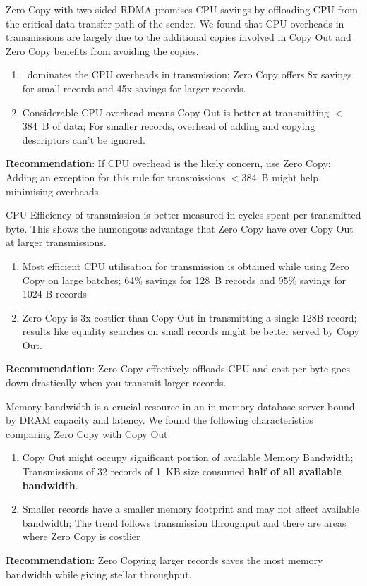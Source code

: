 Zero Copy with two-sided RDMA promises CPU savings by offloading CPU from the critical data transfer path of the sender. We found that 
CPU overheads in transmissions are largely due to the additional copies involved in Copy Out and Zero Copy benefits from avoiding the copies.
  \begin{enumerate}
  \item \memcpy ~dominates the CPU overheads in transmission; Zero Copy offers 8x savings for small records and 45x savings for larger records.
  \item Considerable CPU overhead means Copy Out is better at transmitting $<$384~B of data; For smaller records, overhead of adding and copying descriptors can't be ignored.
  \end{enumerate}
  \textbf{Recommendation}: If CPU overhead is the likely concern, use Zero Copy; Adding an exception for this rule for transmissions $<$384~B might help minimising overheads.

CPU Efficiency of transmission is better measured in cycles spent per transmitted byte. This shows the humongous advantage that Zero Copy have over Copy Out 
at larger transmissions.
  \begin{enumerate}
  \item Most efficient CPU utilisation for transmission is obtained while using Zero Copy on large batches; 64\% savings for 128~B records and 95\% savings for 1024 B records
  \item Zero Copy is 3x costlier than Copy Out in transmitting a single 128B record; results like equality searches on small records might be better served by Copy Out. 
  \end{enumerate}
  \textbf{Recommendation}: Zero Copy effectively offloads CPU and cost per byte goes down drastically when you transmit larger records.

Memory bandwidth is a crucial resource in an in-memory database server bound by DRAM capacity and latency. We found the following characteristics comparing 
Zero Copy with Copy Out
  \begin{enumerate}
  \item Copy Out might occupy significant portion of available Memory Bandwidth; Transmissions of 32 records of 1~KB size consumed \textbf{half of all available bandwidth}.
  \item Smaller records have a smaller memory footprint and may not affect available bandwidth; The trend follows transmission throughput and there are areas where Zero Copy is costlier
  \end{enumerate}
  \textbf{Recommendation}: Zero Copying larger records saves the most memory bandwidth while giving stellar throughput.

